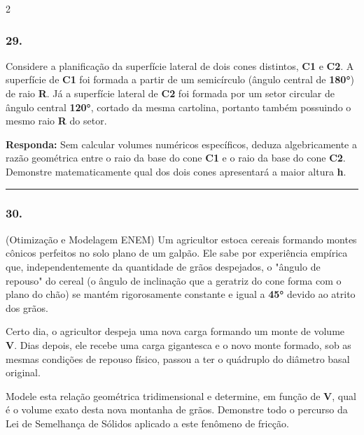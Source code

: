 \documentclass[twoside, 10pt, a4paper]{article}
\newlength{\espacoPreQuestao}\setlength{\espacoPreQuestao}{0.1cm}
\newlength{\espacoQuestao}\setlength{\espacoQuestao}{0.2cm}
\begin{document}
\begin{multicols*}{2}
\subsubsection*{29.} Considere a planificação da superfície lateral de dois cones distintos, \textbf{C1} e \textbf{C2}. A superfície de \textbf{C1} foi formada a partir de um semicírculo (ângulo central de \textbf{180°}) de raio \textbf{R}. Já a superfície lateral de \textbf{C2} foi formada por um setor circular de ângulo central \textbf{120°}, cortado da mesma cartolina, portanto também possuindo o mesmo raio \textbf{R} do setor.
\begin{boxresponda}
\textbf{Responda:} Sem calcular volumes numéricos específicos, deduza algebricamente a razão geométrica entre o raio da base do cone \textbf{C1} e o raio da base do cone \textbf{C2}. Demonstre matematicamente qual dos dois cones apresentará a maior altura \textbf{h}.
\end{boxresponda}
\par\vspace{\espacoQuestao}

\noindent\textcolor{CorLinha}{\rule{\linewidth}{0.5pt}} 
\par\vspace{\espacoPreQuestao}
\subsubsection*{30.} (Otimização e Modelagem ENEM) Um agricultor estoca cereais formando montes cônicos perfeitos no solo plano de um galpão. Ele sabe por experiência empírica que, independentemente da quantidade de grãos despejados, o "ângulo de repouso" do cereal (o ângulo de inclinação que a geratriz do cone forma com o plano do chão) se mantém rigorosamente constante e igual a \textbf{45°} devido ao atrito dos grãos.

Certo dia, o agricultor despeja uma nova carga formando um monte de volume \textbf{V}. Dias depois, ele recebe uma carga gigantesca e o novo monte formado, sob as mesmas condições de repouso físico, passou a ter o quádruplo do diâmetro basal original. 

Modele esta relação geométrica tridimensional e determine, em função de \textbf{V}, qual é o volume exato desta nova montanha de grãos. Demonstre todo o percurso da Lei de Semelhança de Sólidos aplicado a este fenômeno de fricção.
\par\vspace{\espacoQuestao}

\end{multicols*}
\end{document}

